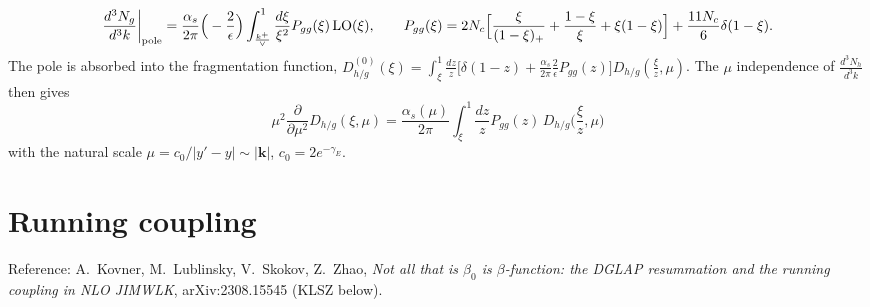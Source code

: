 \documentclass[10pt]{article}
\numberwithin{equation}{section}
\begin{document}
\begin{equation}
\frac{d^3N_g}{d^3k}\bigg|_{\rm pole}=\frac{\alpha_s}{2\pi}\Big(-\frac{2}{\epsilon}\Big)\int_{\frac{k^+}{\vee}}^1\frac{d\xi}{\xi^2}P_{gg}(\xi)\,{\rm LO}(\xi),\qquad P_{gg}(\xi)=2N_c\Big[\frac{\xi}{(1-\xi)_+}+\frac{1-\xi}{\xi}+\xi(1-\xi)\Big]+\frac{11N_c}{6}\delta(1-\xi).
\end{equation}
The pole is absorbed into the fragmentation function, $D^{(0)}_{h/g}(\xi)=\int_\xi^1\frac{dz}{z}\big[\delta(1-z)+\frac{\alpha_s}{2\pi}\frac2\epsilon P_{gg}(z)\big]D_{h/g}(\frac{\xi}{z},\mu)$. The $\mu$ independence of $\frac{d^3N_h}{d^3k}$ then gives
\begin{equation}
\boxed{\mu^2\frac{\partial}{\partial\mu^2}D_{h/g}(\xi,\mu)=\frac{\alpha_s(\mu)}{2\pi}\int_\xi^1\frac{dz}{z}P_{gg}(z)\,D_{h/g}\Big(\frac{\xi}{z},\mu\Big)}
\label{eq:DGLAP}
\end{equation}
with the natural scale $\mu=c_0/|y'-y|\sim|\mathbf k|$, $c_0=2e^{-\gamma_E}$.

\section{Running coupling}\label{sec:rc}
Reference: A.~Kovner, M.~Lublinsky, V.~Skokov, Z.~Zhao, \emph{Not all that is $\beta_0$ is $\beta$-function: the DGLAP resummation and the running coupling in NLO JIMWLK}, arXiv:2308.15545 (KLSZ below).
\end{document}

